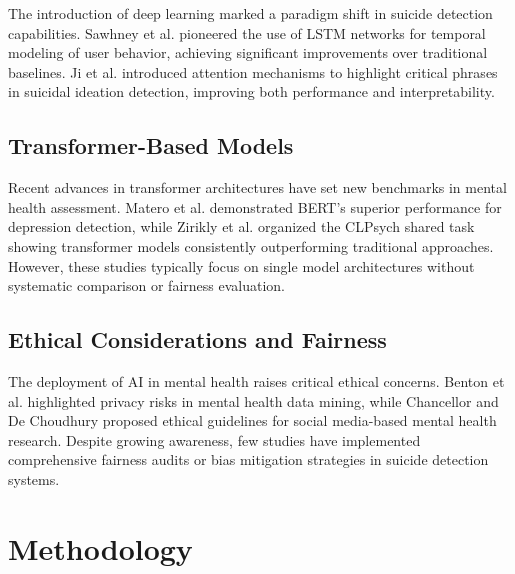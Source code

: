 \documentclass[conference]{IEEEtran}
\begin{document}
The introduction of deep learning marked a paradigm shift in suicide detection capabilities. Sawhney et al. \cite{sawhney2018} pioneered the use of LSTM networks for temporal modeling of user behavior, achieving significant improvements over traditional baselines. Ji et al. \cite{ji2020} introduced attention mechanisms to highlight critical phrases in suicidal ideation detection, improving both performance and interpretability.

\subsection{Transformer-Based Models}

Recent advances in transformer architectures have set new benchmarks in mental health assessment. Matero et al. \cite{matero2021} demonstrated BERT's superior performance for depression detection, while Zirikly et al. \cite{zirikly2019} organized the CLPsych shared task showing transformer models consistently outperforming traditional approaches. However, these studies typically focus on single model architectures without systematic comparison or fairness evaluation.

\subsection{Ethical Considerations and Fairness}

The deployment of AI in mental health raises critical ethical concerns. Benton et al. \cite{benton2017} highlighted privacy risks in mental health data mining, while Chancellor and De Choudhury \cite{chancellor2020} proposed ethical guidelines for social media-based mental health research. Despite growing awareness, few studies have implemented comprehensive fairness audits or bias mitigation strategies in suicide detection systems.

\section{Methodology}
\end{document}
